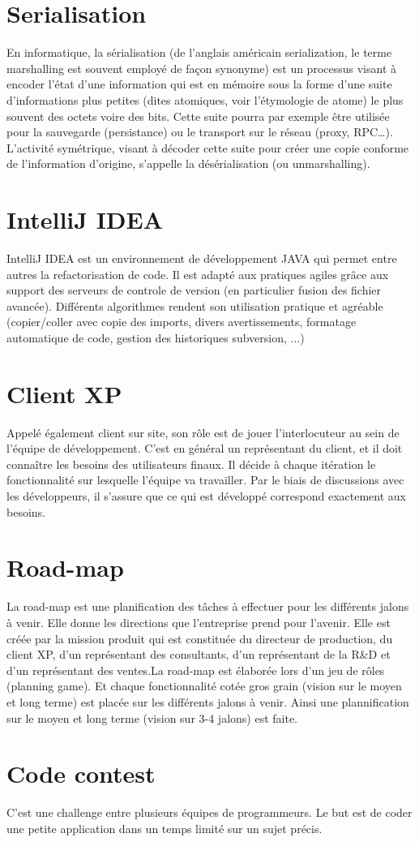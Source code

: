 \section{Serialisation}\label{lexique:serialisation}
En informatique, la sérialisation (de l'anglais américain serialization, le terme marshalling est souvent employé de façon synonyme) est un processus visant à encoder l'état d'une information qui est en mémoire sous la forme d'une suite d'informations plus petites (dites atomiques, voir l'étymologie de atome) le plus souvent des octets voire des bits. Cette suite pourra par exemple être utilisée pour la sauvegarde (persistance) ou le transport sur le réseau (proxy, RPC…). L'activité symétrique, visant à décoder cette suite pour créer une copie conforme de l'information d'origine, s'appelle la désérialisation (ou unmarshalling).

\section{IntelliJ IDEA}\label{lexique:IDEA}
IntelliJ IDEA est un environnement de développement JAVA qui permet entre autres la refactorisation de code. Il est adapté aux pratiques agiles grâce aux support des serveurs de controle de version (en particulier fusion des fichier avancée). Différents algorithmes rendent son utilisation pratique et agréable (copier/coller avec copie des imports, divers avertissements, formatage automatique de code, gestion des historiques subversion, ...)

\section{Client XP}\label{lexique:clientXP}
Appelé également client sur site, son rôle est de jouer l'interlocuteur au sein de l'équipe de développement. C'est en général un représentant du client, et il doit connaître les besoins des utilisateurs finaux. Il décide à chaque itération le fonctionnalité sur lesquelle l'équipe va travailler. Par le biais de discussions avec les développeurs, il s'assure que ce qui est développé correspond exactement aux besoins.

\section{Road-map}
La road-map est une planification des tâches à effectuer pour les différents jalons à venir. Elle donne les directions que l'entreprise prend pour l'avenir. Elle est créée par la mission produit qui est constituée du directeur de production, du client XP, d'un représentant des consultants, d'un représentant de la R\&D et d'un représentant des ventes.La road-map est élaborée lors d'un jeu de rôles (planning game). Et chaque fonctionnalité cotée gros grain (vision sur le moyen et long terme) est placée sur les différents jalons à venir. Ainsi une plannification sur le moyen et long terme (vision sur 3-4 jalons) est faite.

\section{Code contest}\label{lexique:codeContest}
C'est une challenge entre plusieurs équipes de programmeurs. Le but est de coder une petite application dans un temps limité sur un sujet précis. 
